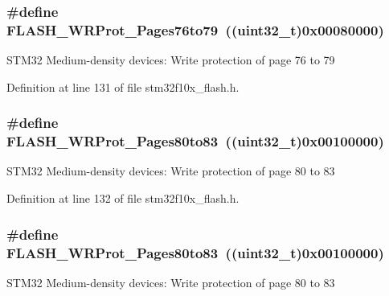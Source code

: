 \subsubsection[{\texorpdfstring{F\+L\+A\+S\+H\+\_\+\+W\+R\+Prot\+\_\+\+Pages76to79}{FLASH_WRProt_Pages76to79}}]{\setlength{\rightskip}{0pt plus 5cm}\#define F\+L\+A\+S\+H\+\_\+\+W\+R\+Prot\+\_\+\+Pages76to79~(({\bf uint32\+\_\+t})0x00080000)}\hypertarget{group___option___bytes___write___protection_ga9e1f9abfa57766312c6cbae9b42f3ab6}{}\label{group___option___bytes___write___protection_ga9e1f9abfa57766312c6cbae9b42f3ab6}
S\+T\+M32 Medium-\/density devices\+: Write protection of page 76 to 79 

Definition at line 131 of file stm32f10x\+\_\+flash.\+h.

\subsubsection[{\texorpdfstring{F\+L\+A\+S\+H\+\_\+\+W\+R\+Prot\+\_\+\+Pages80to83}{FLASH_WRProt_Pages80to83}}]{\setlength{\rightskip}{0pt plus 5cm}\#define F\+L\+A\+S\+H\+\_\+\+W\+R\+Prot\+\_\+\+Pages80to83~(({\bf uint32\+\_\+t})0x00100000)}\hypertarget{group___option___bytes___write___protection_ga5749428874f99f77a5c5fc48a88816d9}{}\label{group___option___bytes___write___protection_ga5749428874f99f77a5c5fc48a88816d9}
S\+T\+M32 Medium-\/density devices\+: Write protection of page 80 to 83 

Definition at line 132 of file stm32f10x\+\_\+flash.\+h.

\subsubsection[{\texorpdfstring{F\+L\+A\+S\+H\+\_\+\+W\+R\+Prot\+\_\+\+Pages80to83}{FLASH_WRProt_Pages80to83}}]{\setlength{\rightskip}{0pt plus 5cm}\#define F\+L\+A\+S\+H\+\_\+\+W\+R\+Prot\+\_\+\+Pages80to83~(({\bf uint32\+\_\+t})0x00100000)}\hypertarget{group___option___bytes___write___protection_ga5749428874f99f77a5c5fc48a88816d9}{}\label{group___option___bytes___write___protection_ga5749428874f99f77a5c5fc48a88816d9}
S\+T\+M32 Medium-\/density devices\+: Write protection of page 80 to 83 

